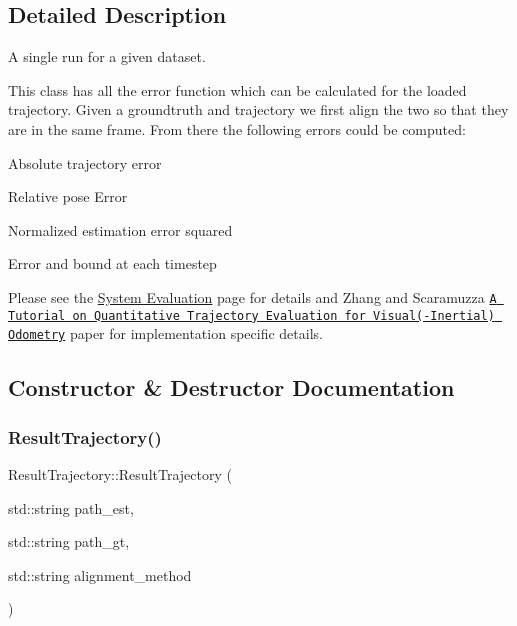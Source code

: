 \subsection{Detailed Description}
A single run for a given dataset. 

This class has all the error function which can be calculated for the loaded trajectory. Given a groundtruth and trajectory we first align the two so that they are in the same frame. From there the following errors could be computed\+:
\begin{DoxyItemize}
\item Absolute trajectory error
\item Relative pose Error
\item Normalized estimation error squared
\item Error and bound at each timestep
\end{DoxyItemize}

Please see the \hyperlink{evaluation}{System Evaluation} page for details and Zhang and Scaramuzza \href{http://rpg.ifi.uzh.ch/docs/IROS18_Zhang.pdf}{\tt A Tutorial on Quantitative Trajectory Evaluation for Visual(-\/\+Inertial) Odometry} paper for implementation specific details. 

\subsection{Constructor \& Destructor Documentation}
\mbox{\label{classov__eval_1_1ResultTrajectory_a91d8d079db9f290d384746b7a030e336}} 
\subsubsection{\texorpdfstring{Result\+Trajectory()}{ResultTrajectory()}}
{\footnotesize\ttfamily Result\+Trajectory\+::\+Result\+Trajectory (\begin{DoxyParamCaption}\item[{std\+::string}]{path\+\_\+est,  }\item[{std\+::string}]{path\+\_\+gt,  }\item[{std\+::string}]{alignment\+\_\+method }\end{DoxyParamCaption})}



